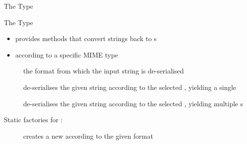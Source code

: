 \documentclass[handout]{beamer}
\begin{document}
\begin{frame}[allowframebreaks]{The  Type}

    \begin{block}{The  Type}
        \begin{itemize}
            \item provides methods that convert strings back to s
            \item according to a specific MIME type
        \end{itemize}
    \end{block}
    \begin{description}
        \item [] the format from which the input string is de-serialised
        \item [] de-serialises the given string according to the selected , yielding a single 
        \item []  de-serialises the given string according to the selected , yielding multiple s
    \end{description}

    \framebreak

    Static factories for :
    \begin{description}
        \item [] creates a new  according to the given format
    \end{description}

\end{frame}
\end{document}
